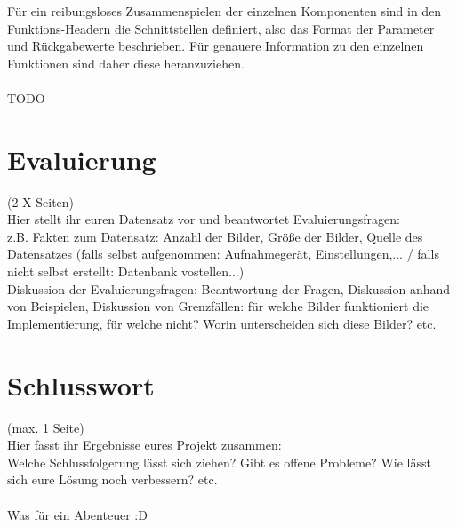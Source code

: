 \documentclass[deutsch]{scrartcl}
\begin{document}
Für ein reibungsloses Zusammenspielen der einzelnen Komponenten sind in den Funktions-Headern die Schnittstellen definiert, also das Format der Parameter und Rückgabewerte beschrieben. Für genauere Information zu den einzelnen Funktionen sind daher diese heranzuziehen.\\\\
TODO\\

\newpage
\section{Evaluierung}
(2-X Seiten)\\
Hier stellt ihr euren Datensatz vor und beantwortet Evaluierungsfragen:\\
z.B. Fakten zum Datensatz: Anzahl der Bilder, Größe der Bilder, Quelle des Datensatzes (falls selbst aufgenommen: Aufnahmegerät, Einstellungen,... / falls nicht selbst erstellt: Datenbank vostellen...)\\
Diskussion der Evaluierungsfragen: Beantwortung der Fragen, Diskussion anhand von Beispielen, Diskussion von Grenzfällen: für welche Bilder funktioniert die Implementierung, für welche nicht? Worin unterscheiden sich diese Bilder? etc.

\newpage
\section{Schlusswort}
(max. 1 Seite)\\
Hier fasst ihr Ergebnisse eures Projekt zusammen:\\
Welche Schlussfolgerung lässt sich ziehen? Gibt es offene Probleme? Wie lässt sich eure Lösung noch verbessern? etc.\\\\
Was für ein Abenteuer :D

\newpage


\end{document}
